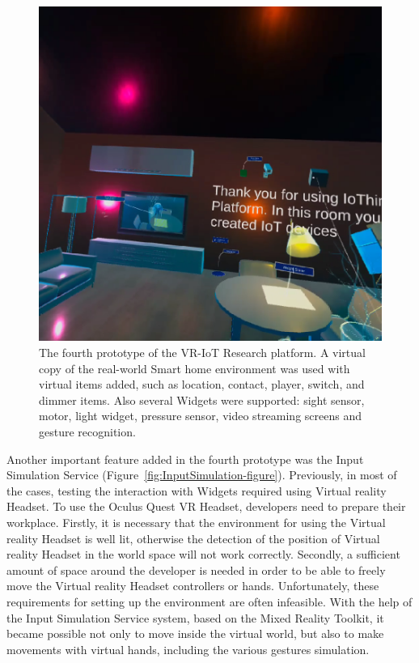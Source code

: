 \begin{figure}
  \centering
  \includegraphics[width=0.6\linewidth]{figures/Prototype4.png}
  \caption{The fourth prototype of the VR-IoT Research platform. A virtual copy of the real-world Smart home environment was used with virtual items added, such as location, contact, player, switch, and dimmer items. Also several Widgets were supported: sight sensor, motor, light widget, pressure sensor, video streaming screens and gesture recognition.}
  \label{fig:Prototype4-figure}
\end{figure}

Another important feature added in the fourth prototype was the Input Simulation Service (Figure~\ref{fig:InputSimulation-figure}). Previously, in most of the cases, testing the interaction with Widgets required using Virtual reality Headset. To use the Oculus Quest VR Headset, developers need to prepare their workplace. Firstly, it is necessary that the environment for using the Virtual reality Headset is well lit, otherwise the detection of the position of Virtual reality Headset in the world space will not work correctly. Secondly, a sufficient amount of space around the developer is needed in order to be able to freely move the Virtual reality Headset controllers or hands. Unfortunately, these requirements for setting up the environment are often infeasible. With the help of the Input Simulation Service system, based on the Mixed Reality Toolkit, it became possible not only to move inside the virtual world, but also to make movements with virtual hands, including the various gestures simulation.



